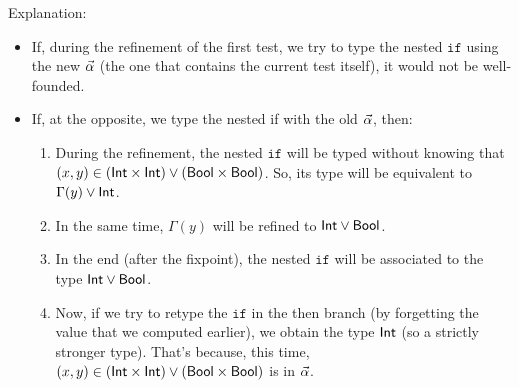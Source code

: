 \documentclass[a4paper]{article}
\theoremstyle{definition}
\begin{document}
    Explanation:
    \begin{itemize}
      \item If, during the refinement of the first test, we try to type the nested $\texttt{if}$ using the new $\vec \alpha$ (the one that contains the current test itself),
      it would not be well-founded.
      \item If, at the opposite, we type the nested if with the old $\vec \alpha$, then:
      \begin{enumerate}
        \item During the refinement, the nested $\texttt{if}$ will be typed without knowing that $(x,y)\in(\text{\textsf{Int}}\times \text{\textsf{Int}})\vee(\text{\textsf{Bool}}\times \text{\textsf{Bool}})$.
        So, its type will be equivalent to $\Gamma(y) \vee \text{\textsf{Int}}$.
        \item In the same time, $\Gamma(y)$ will be refined to $\text{\textsf{Int}} \vee \text{\textsf{Bool}}$.
        \item In the end (after the fixpoint), the nested $\texttt{if}$ will be associated to the type $\text{\textsf{Int}} \vee \text{\textsf{Bool}}$.
        \item Now, if we try to retype the $\texttt{if}$ in the then branch (by forgetting the value that we computed earlier),
        we obtain the type $\text{\textsf{Int}}$ (so a strictly stronger type).
        That's because, this time, $(x,y)\in(\text{\textsf{Int}}\times \text{\textsf{Int}})\vee(\text{\textsf{Bool}}\times \text{\textsf{Bool}})$ is in $\vec \alpha$.
      \end{enumerate}
    \end{itemize}
    
\end{document}
